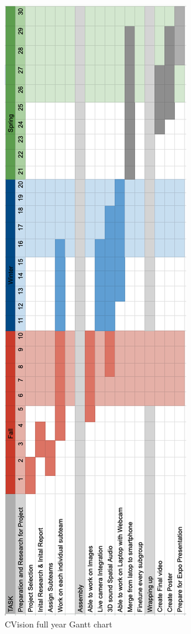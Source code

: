 \documentclass[12pt,a4paper]{article}
\begin{document}
\begin{figure}[p]
    \vspace*{-2cm}  %
    \centering      %
    \includegraphics[width=0.49\linewidth]{full_gant.png}  %
    \caption{CVision full year Gantt chart}
    \label{full_gant}
    \vspace*{\fill} %
\end{figure}
\end{document}
